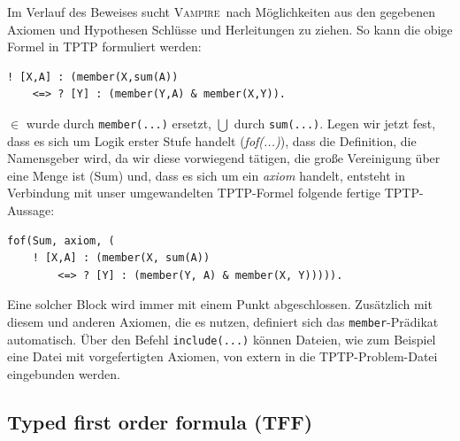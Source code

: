 \documentclass{article}
\newcommand{\vampire}{\textsc{Vampire}~}
\begin{document}
Im Verlauf des Beweises sucht \vampire nach Möglichkeiten aus den gegebenen Axiomen und Hypothesen Schlüsse und Herleitungen zu ziehen.
So kann die obige Formel in TPTP formuliert werden:
\begin{lstlisting}[language=tptp]
! [X,A] : (member(X,sum(A))
	<=> ? [Y] : (member(Y,A) & member(X,Y)).
\end{lstlisting}
$\in$ wurde durch \verb=member(...)= ersetzt, $\bigcup$ durch \verb=sum(...)=.
Legen wir jetzt fest, dass es sich um Logik erster Stufe handelt (\textit{fof(...)}), dass die Definition, 
die Namensgeber wird, da wir diese vorwiegend tätigen, die große Vereinigung über eine Menge ist (Sum) und, dass es sich um ein \textit{axiom} handelt,
entsteht in Verbindung mit unser umgewandelten TPTP-Formel folgende fertige TPTP-Aussage:
\begin{lstlisting}[language=tptp]
fof(Sum, axiom, (	
	! [X,A] : (member(X, sum(A)) 
		<=> ? [Y] : (member(Y, A) & member(X, Y))))).
\end{lstlisting}
Eine solcher Block wird immer mit einem Punkt abgeschlossen.
Zusätzlich mit diesem und anderen Axiomen, die es nutzen, definiert sich das \verb=member=-Prädikat automatisch.
Über den Befehl \verb|include(...)| können Dateien, wie zum Beispiel eine Datei mit vorgefertigten Axiomen, von extern in die TPTP-Problem-Datei eingebunden werden.

\subsection{Typed first order formula (TFF)}
\label{subsec:tptptff}
\end{document}
